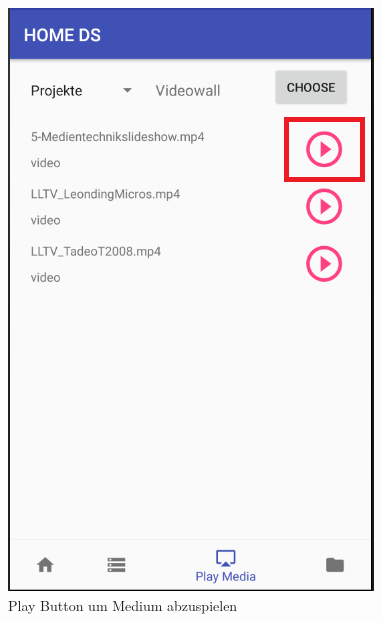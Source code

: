 \begin{figure}[H]
\centering
\includegraphics[scale=0.35]{images/06_AndroidApp/06_playMedia}
\caption{Play Button um Medium abzuspielen}
\label{fig:playBut}
\end{figure}
\\
